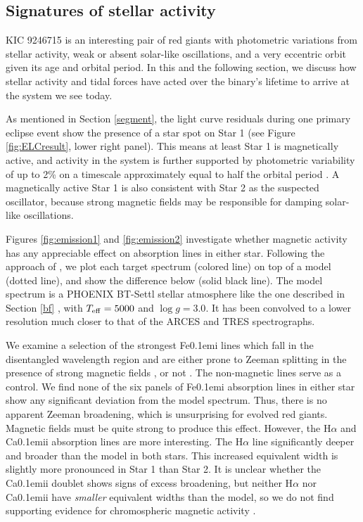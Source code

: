 \subsection{Signatures of stellar activity}\label{actrot}
KIC 9246715 is an interesting pair of red giants with photometric variations from stellar activity, weak or absent solar-like oscillations, and a very eccentric orbit given its age and orbital period. In this and the following section, we discuss how stellar activity and tidal forces have acted over the binary's lifetime to arrive at the system we see today.

As mentioned in Section \ref{segment}, the light curve residuals during one primary eclipse event show the presence of a star spot on Star 1 (see Figure \ref{fig:ELCresult}, lower right panel). This means at least Star 1 is magnetically active, and activity in the system is further supported by photometric variability of up to 2\% on a timescale approximately equal to half the orbital period \citep{gau14}. A magnetically active Star 1 is also consistent with Star 2 as the suspected oscillator, because strong magnetic fields may be responsible for damping solar-like oscillations.

Figures \ref{fig:emission1} and \ref{fig:emission2} investigate whether magnetic activity has any appreciable effect on absorption lines in either star. Following the approach of \citet{fro12}, we plot each target spectrum (colored line) on top of a model (dotted line), and show the difference below (solid black line). The model spectrum is a PHOENIX BT-Settl stellar atmosphere like the one described in Section \ref{bf} \citep{all03,asp09}, with $T_{\rm{eff}} = 5000$ and $\log g = 3.0$. It has been convolved to a lower resolution much closer to that of the ARCES and TRES spectrographs.

We examine a selection of the strongest {\rm Fe}\kern 0.1em{\sc i} lines which fall in the disentangled wavelength region and are either prone to Zeeman splitting in the presence of strong magnetic fields \citep{har73}, or not \citep{sis70}. The non-magnetic lines serve as a control. We find none of the six panels of {\rm Fe}\kern 0.1em{\sc i} absorption lines in either star show any significant deviation from the model spectrum. Thus, there is no apparent Zeeman broadening, which is unsurprising for evolved red giants. Magnetic fields must be quite strong to produce this effect. However, the H$\alpha$ and {\rm Ca}\kern 0.1em{\sc ii} absorption lines are more interesting. The H$\alpha$ line significantly deeper and broader than the model in both stars. This increased equivalent width is slightly more pronounced in Star 1 than Star 2. It is unclear whether the {\rm Ca}\kern 0.1em{\sc ii} doublet shows signs of excess broadening, but neither H$\alpha$ nor {\rm Ca}\kern 0.1em{\sc ii} have \emph{smaller} equivalent widths than the model, so we do not find supporting evidence for chromospheric magnetic activity \citep{fro12}.

  
  
  
  
  
  
  
  
  